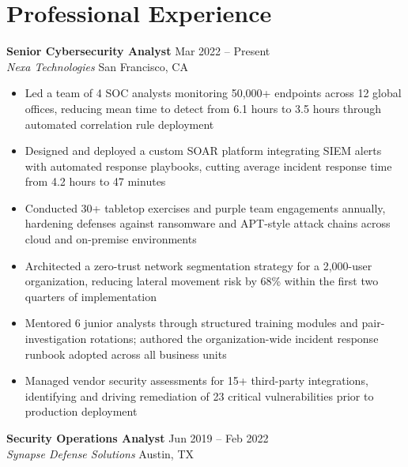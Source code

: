 \documentclass[11pt,a4paper]{article}
\newcommand{\cvdate}[1]{\textcolor{mediumgray}{\small #1}}
\begin{document}
\section{Professional Experience}

\vspace{4pt}

\noindent
\textbf{Senior Cybersecurity Analyst} \hfill \cvdate{Mar 2022 -- Present}\\
\textit{Nexa Technologies} \textbar{} San Francisco, CA

\begin{itemize}
  \item Led a team of 4 SOC analysts monitoring 50,000+ endpoints across 12 global offices, reducing mean time to detect from 6.1 hours to 3.5 hours through automated correlation rule deployment
  \item Designed and deployed a custom SOAR platform integrating SIEM alerts with automated response play\-books, cutting average incident response time from 4.2 hours to 47 minutes
  \item Conducted 30+ tabletop exercises and purple team engagements annually, hardening defenses against ransomware and APT-style attack chains across cloud and on-premise environments
  \item Architected a zero-trust network segmentation strategy for a 2,000-user organization, reducing lateral movement risk by 68\% within the first two quarters of implementation
  \item Mentored 6 junior analysts through structured training modules and pair-investigation rotations; authored the organization-wide incident response runbook adopted across all business units
  \item Managed vendor security assessments for 15+ third-party integrations, identifying and driving remediation of 23 critical vulnerabilities prior to production deployment
\end{itemize}

\vspace{8pt}

\noindent
\textbf{Security Operations Analyst} \hfill \cvdate{Jun 2019 -- Feb 2022}\\
\textit{Synapse Defense Solutions} \textbar{} Austin, TX
\end{document}
